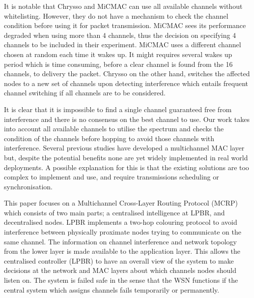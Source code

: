 It is notable that Chrysso and MiCMAC can use all available channels without whitelisting. However, they do not have a mechanism to check the channel condition before using it for packet transmission. MiCMAC sees its performance degraded when using more than 4 channels, thus the decision on specifying 4 channels to be included in their experiment. 
MiCMAC uses a different channel chosen at random each time it wakes up.
It might requires several wakes up period which is time consuming, before a clear channel is found from the 16 channels, to delivery the packet. 
Chrysso on the other hand, switches the affected nodes to a new set of channels upon detecting interference which entails frequent channel switching if all channels are to be considered.

It is clear that it is impossible to find a single channel guaranteed free from interference and there is no consensus on the best channel to use. Our work takes into account all available channels to utilise the spectrum and checks the condition of the channels before hopping to avoid those channels with interference. Several previous studies have developed a multichannel MAC layer but, despite the potential benefits none are yet widely implemented in real world deployments. 
A possible explanation for this is that the existing solutions are too complex to implement and use, and require transmissions scheduling or synchronisation. 

This paper focuses on a Multichannel Cross-Layer Routing Protocol (MCRP) which consists of two main parts; a centralised intelligence at LPBR, and decentralised nodes. LPBR implements a two-hop colouring protocol to avoid interference between physically proximate nodes trying to communicate on the same channel. The information on channel interference and network topology from the lower layer is made available to the application layer. This allows the centralised controller (LPBR) to have an overall view of the system to make decisions at the network and MAC layers about which channels nodes should listen on. The system is failed safe in the sense that the WSN functions if the central system which assigns channels fails temporarily or permanently.
 

